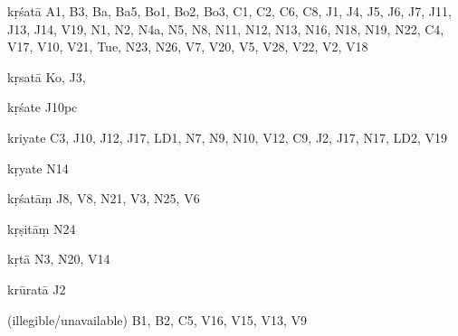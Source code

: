 \begin{ekdosis}
\begin{marma}[hp01_055]
\begin{marma}[hp02_009]
\begin{marma}[hp02_011]
\begin{marma}[hp02_012]
\begin{description}
          \end{description}
        \end{marma}

        \begin{marma}[hp02_019]
        \item[kṛśatā] A1, B3, Ba, Ba5, Bo1, Bo2, Bo3, C1, C2, C6, C8, J1, J4, J5, J6, J7, J11, J13, J14, V19, N1, N2, N4a, N5, N8, N11, N12, N13, N16, N18, N19, N22, C4, V17, V10, V21, Tue, N23, N26, V7, V20, V5, V28, V22, V2, V18
        \item[kṛsatā] Ko, J3,  
        \item[kṛśate] J10pc
        \item[kriyate] C3, J10, J12, J17, LD1, N7, N9, N10, V12, C9, J2, J17, N17, LD2, V19
        \item[kṛyate] N14
        \item[kṛśatāṃ] J8, V8, N21, V3, N25, V6
        \item[kṛṣitāṃ] N24
        \item[kṛtā] N3, N20, V14
        \item[krūratā] J2
        \item[(illegible/unavailable)]   B1, B2, C5, V16, V15, V13, V9
          \begin{description}

          \end{description}
        \end{marma}


\end{marma}
\end{marma}
\end{marma}
\end{ekdosis}
